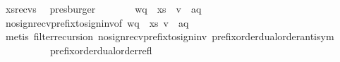 \begin{isabellebody}
\ xs{\isacharunderscore}{\kern0pt}recvs\ \isamarkupfalse%
\ presburger\isanewline
\ \ \ \ \isamarkupfalse%
\ \isamarkupfalse%
\ {\isachardoublequoteopen}{\isacharparenleft}{\kern0pt}wq\ {\isasymsqdot}\ xs{\isacharparenright}{\kern0pt}{\isasymdown}\isactrlsub {\isacharquery}{\kern0pt}\ {\isacharequal}{\kern0pt}\ {\isacharparenleft}{\kern0pt}{\isacharparenleft}{\kern0pt}{\isacharparenleft}{\kern0pt}{\isacharquery}{\kern0pt}v{\isacharprime}{\kern0pt}\ {\isasymsqdot}\ {\isacharbrackleft}{\kern0pt}a{\isacharbrackright}{\kern0pt}{\isacharparenright}{\kern0pt}{\isasymdown}\isactrlsub q{\isacharparenright}{\kern0pt}{\isasymdown}\isactrlsub {\isacharquery}{\kern0pt}{\isacharparenright}{\kern0pt}{\isachardoublequoteclose}\ \ \isamarkupfalse%
\ no{\isacharunderscore}{\kern0pt}sign{\isacharunderscore}{\kern0pt}recv{\isacharunderscore}{\kern0pt}prefix{\isacharunderscore}{\kern0pt}to{\isacharunderscore}{\kern0pt}sign{\isacharunderscore}{\kern0pt}inv{\isacharbrackleft}{\kern0pt}of\ {\isachardoublequoteopen}{\isacharparenleft}{\kern0pt}wq\ {\isasymsqdot}\ xs{\isacharparenright}{\kern0pt}{\isasymdown}\isactrlsub {\isacharquery}{\kern0pt}{\isachardoublequoteclose}\ {\isachardoublequoteopen}{\isacharparenleft}{\kern0pt}{\isacharparenleft}{\kern0pt}{\isacharparenleft}{\kern0pt}{\isacharquery}{\kern0pt}v{\isacharprime}{\kern0pt}\ {\isasymsqdot}\ {\isacharbrackleft}{\kern0pt}a{\isacharbrackright}{\kern0pt}{\isacharparenright}{\kern0pt}{\isasymdown}\isactrlsub q{\isacharparenright}{\kern0pt}{\isasymdown}\isactrlsub {\isacharquery}{\kern0pt}{\isacharparenright}{\kern0pt}{\isachardoublequoteclose}{\isacharbrackright}{\kern0pt}\ \isamarkupfalse%
\ {\isacharparenleft}{\kern0pt}metis\ filter{\isacharunderscore}{\kern0pt}recursion\ no{\isacharunderscore}{\kern0pt}sign{\isacharunderscore}{\kern0pt}recv{\isacharunderscore}{\kern0pt}prefix{\isacharunderscore}{\kern0pt}to{\isacharunderscore}{\kern0pt}sign{\isacharunderscore}{\kern0pt}inv\ prefix{\isacharunderscore}{\kern0pt}order{\isachardot}{\kern0pt}dual{\isacharunderscore}{\kern0pt}order{\isachardot}{\kern0pt}antisym\isanewline
\ \ \ \ \ \ \ \ \ \ prefix{\isacharunderscore}{\kern0pt}order{\isachardot}{\kern0pt}dual{\isacharunderscore}{\kern0pt}order{\isachardot}{\kern0pt}refl{\isacharparenright}{\kern0pt}\ \isanewline
\ \ \ \ \isamarkupfalse%
\ \isamarkupfalse%

\end{isabellebody}
